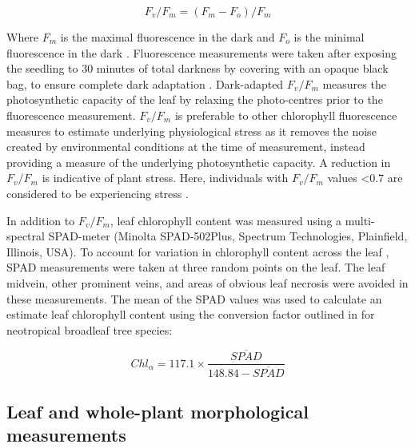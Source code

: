 \documentclass[a4paper, 11pt]{article}
\begin{document}
\begin{equation} \label{eq:fvfm}
F_v/F_m = (F_m - F_o)/F_m
\end{equation}

Where $F_m$ is the maximal fluorescence in the dark and $F_o$ is the minimal fluorescence in the dark \citep{Maxwell2000}. Fluorescence measurements were taken after exposing the seedling to 30 minutes of total darkness by covering with an opaque black bag, to ensure complete dark adaptation \citep{Campbell2007}. Dark-adapted $F_v/F_m$ measures the photosynthetic capacity of the leaf by relaxing the photo-centres prior to the fluorescence measurement. $F_v/F_m$ is preferable to other chlorophyll fluorescence measures to estimate underlying physiological stress as it removes the noise created by environmental conditions at the time of measurement, instead providing a measure of the underlying photosynthetic capacity. A reduction in $F_v/F_m$ is indicative of plant stress. Here, individuals with $F_v/F_m$ values \textless{}0.7 are considered to be experiencing stress \citep{Maxwell2000}. 

In addition to $F_v/F_m$, leaf chlorophyll content was measured using a multi-spectral SPAD-meter (Minolta SPAD-502Plus, Spectrum Technologies, Plainfield, Illinois, USA). To account for variation in chlorophyll content across the leaf \citep{Serrano2008}, SPAD measurements were taken at three random points on the leaf. The leaf midvein, other prominent veins, and areas of obvious leaf necrosis were avoided in these measurements. The mean of the SPAD values was used to calculate an estimate leaf chlorophyll content using the conversion factor outlined in \citet{Coste2010} for neotropical broadleaf tree species:

\begin{equation} \label{eq:chl-spad}
Chl_\alpha = 117.1 \times \frac{\overline{SPAD}}{148.84 - \overline{SPAD}}
\end{equation}


\subsection{Leaf and whole-plant morphological measurements}
\end{document}
